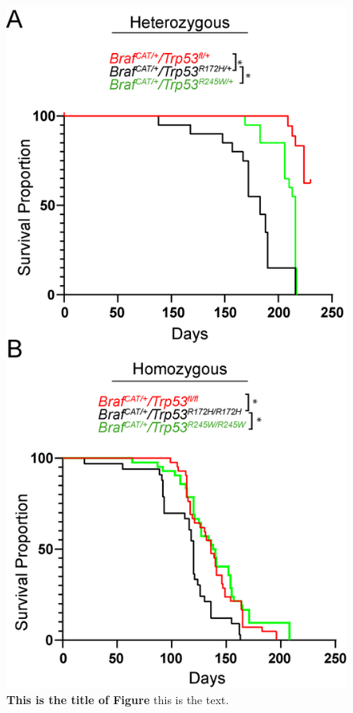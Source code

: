 \begin{figure}
\hypertarget{fig:04}{%
\centering
\includegraphics[width=1\textwidth,height=\textheight]{images/p53_3.png}
\caption{\textbf{This is the title of Figure} this is the text.}\label{fig:04}
}
\end{figure}

